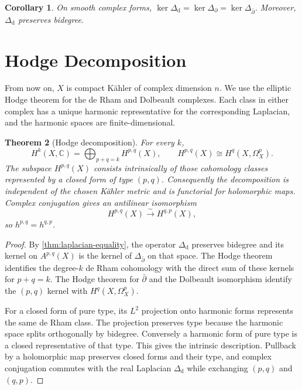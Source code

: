 \documentclass[11pt,reqno]{amsart}
\newtheorem{theorem}{Theorem}[section]
\newtheorem{corollary}[theorem]{Corollary}
\theoremstyle{definition}
\theoremstyle{remark}
\newcommand{\C}{\mathbb{C}}
\newcommand{\dd}{\mathrm{d}}
\newcommand{\dbar}{\bar\partial}
\begin{document}
\begin{corollary}
\label{cor:harmonic-agree}
On smooth complex forms, $\ker\Delta_\dd=\ker\Delta_\partial
=\ker\Delta_{\dbar}$. Moreover, $\Delta_\dd$ preserves bidegree.
\end{corollary}

\section{Hodge Decomposition}
\label{sec:hodge}

From now on, $X$ is compact K\"ahler of complex dimension $n$.
We use the elliptic Hodge theorem for the de Rham and Dolbeault complexes.
Each class in either complex has a unique harmonic representative for the
corresponding Laplacian, and the harmonic spaces are finite-dimensional.

\begin{theorem}[Hodge decomposition]
\label{thm:hodge}
For every $k$,
\[
H^k(X,\C)=\bigoplus_{p+q=k}H^{p,q}(X),
\qquad
H^{p,q}(X)\cong H^q(X,\Omega_X^p).
\]
The subspace $H^{p,q}(X)$ consists intrinsically of those cohomology classes
represented by a closed form of type $(p,q)$. Consequently the decomposition
is independent of the chosen K\"ahler metric and is functorial for
holomorphic maps.
Complex conjugation gives an antilinear isomorphism
\[
H^{p,q}(X)\xrightarrow{\sim}H^{q,p}(X),
\]
so $h^{p,q}=h^{q,p}$.
\end{theorem}

\begin{proof}
By \cref{thm:laplacian-equality}, the operator $\Delta_\dd$ preserves
bidegree and its kernel on $A^{p,q}(X)$ is the kernel of $\Delta_{\dbar}$
on that space. The Hodge theorem identifies the degree-$k$ de Rham
cohomology with the direct sum of these kernels for $p+q=k$.
The Hodge theorem for $\dbar$ and the Dolbeault isomorphism identify
the $(p,q)$ kernel with $H^q(X,\Omega_X^p)$.

For a closed form of pure type, its $L^2$ projection onto harmonic forms
represents the same de Rham class. The projection preserves type because
the harmonic space splits orthogonally by bidegree. Conversely a harmonic
form of pure type is a closed representative of that type. This gives
the intrinsic description. Pullback by a holomorphic map preserves
closed forms and their type, and complex conjugation commutes with the
real Laplacian $\Delta_\dd$ while exchanging $(p,q)$ and $(q,p)$.
\end{proof}
\end{document}
